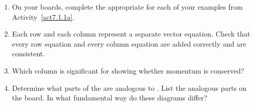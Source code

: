 \vspace{-12pt}

\begin{enumerate}
	\item On your boards, complete the appropriate \pchart{} for each of your examples from Activity~\ref{act7.1.1a}.
	
	\item Each row and each column represent a separate vector equation. Check that every row equation and every column equation are added correctly and are consistent.
	
	\item Which column is significant for showing whether momentum is conserved?
	
	\item Determine what parts of the \pcharts{} are analogous to \EnergyDiagrams{}. List the analogous parts on the board. In what fundamental way do these diagrams differ?
\end{enumerate}

\WCD 

